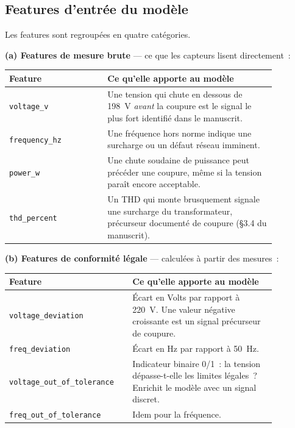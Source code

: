 \documentclass[12pt,a4paper]{article}
\begin{document}
\subsection{Features d'entrée du modèle}

Les features sont regroupées en quatre catégories.

\bigskip
\noindent
\textbf{(a) Features de mesure brute} — ce que les capteurs lisent directement~:

\begin{center}
\begin{tabular}{p{0.32\linewidth} p{0.55\linewidth}}
\toprule
\textbf{Feature} & \textbf{Ce qu'elle apporte au modèle} \\
\midrule
\texttt{voltage\_v}     &
  Une tension qui chute en dessous de 198~V \emph{avant} la coupure
  est le signal le plus fort identifié dans le manuscrit. \\
\texttt{frequency\_hz}  &
  Une fréquence hors norme indique une surcharge ou un défaut réseau
  imminent. \\
\texttt{power\_w}       &
  Une chute soudaine de puissance peut précéder une coupure,
  même si la tension paraît encore acceptable. \\
\texttt{thd\_percent}   &
  Un THD qui monte brusquement signale une surcharge du transformateur,
  précurseur documenté de coupure (\S3.4 du manuscrit). \\
\bottomrule
\end{tabular}
\end{center}

\bigskip
\noindent
\textbf{(b) Features de conformité légale} — calculées à partir des mesures~:

\begin{center}
\begin{tabular}{p{0.38\linewidth} p{0.49\linewidth}}
\toprule
\textbf{Feature} & \textbf{Ce qu'elle apporte au modèle} \\
\midrule
\texttt{voltage\_deviation}          &
  Écart en Volts par rapport à 220~V. Une valeur négative croissante
  est un signal précurseur de coupure. \\
\texttt{freq\_deviation}             &
  Écart en Hz par rapport à 50~Hz. \\
\texttt{voltage\_out\_of\_tolerance} &
  Indicateur binaire 0/1~: la tension dépasse-t-elle les limites
  légales~? Enrichit le modèle avec un signal discret. \\
\texttt{freq\_out\_of\_tolerance}    &
  Idem pour la fréquence. \\
\bottomrule
\end{tabular}
\end{center}
\end{document}
